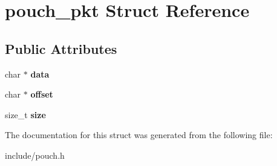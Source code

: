 \hypertarget{structpouch__pkt}{
\section{pouch\_\-pkt Struct Reference}
\label{structpouch__pkt}
}
\subsection*{Public Attributes}
\begin{DoxyCompactItemize}
\item 
\hypertarget{structpouch__pkt_a2e132e62e71cc0e5593403dae19d064d}{
char $\ast$ {\bfseries data}}
\label{structpouch__pkt_a2e132e62e71cc0e5593403dae19d064d}

\item 
\hypertarget{structpouch__pkt_a14b9291b402272cdc9d78c4ef16cbb92}{
char $\ast$ {\bfseries offset}}
\label{structpouch__pkt_a14b9291b402272cdc9d78c4ef16cbb92}

\item 
\hypertarget{structpouch__pkt_ad77e988de8c755607a21e988dabc2485}{
size\_\-t {\bfseries size}}
\label{structpouch__pkt_ad77e988de8c755607a21e988dabc2485}

\end{DoxyCompactItemize}


The documentation for this struct was generated from the following file:\begin{DoxyCompactItemize}
\item 
include/pouch.h\end{DoxyCompactItemize}
